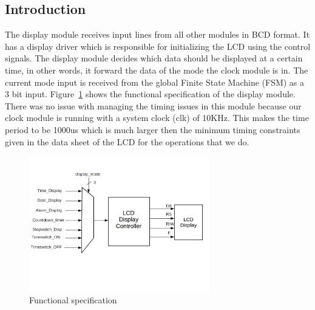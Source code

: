 \documentclass[a4paper]{article}
\begin{document}
\subsection{Introduction}

The display module receives input lines from all other modules in BCD format. It has a display driver which is responsible for initializing the LCD using the control signals. The display module decides which data should be displayed at a certain time, in other words, it forward the data of the mode the clock module is in. The current mode input is received from the global Finite State Machine (FSM) as a 3 bit input. Figure~\ref{fig:FUNC} shows the functional specification of the display module. There was no issue with managing the timing issues in this module because our clock module is running with a system clock (clk) of 10KHz. This makes the time period to be 1000us which is much larger then the minimum timing constraints given in the data sheet of the LCD for the operations that we do. 

\begin{figure}[h!]
  \begin{center}
    \includegraphics[width=0.7\textwidth]{FUNC.png}
    \caption{Functional specification}
    \label{fig:FUNC}
  \end{center}
\end{figure}
\end{document}
